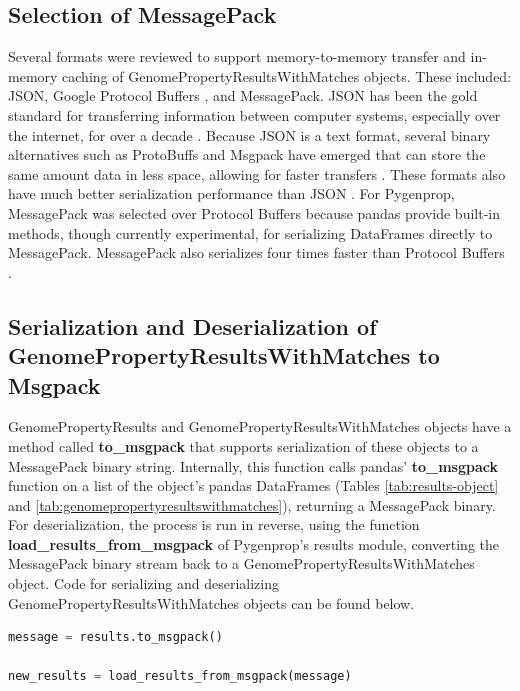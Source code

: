 \subsection{Selection of MessagePack}

Several formats were reviewed to support memory-to-memory transfer and in-memory caching of GenomePropertyResultsWithMatches objects. These included: JSON, Google Protocol Buffers \cite{varda2008protocol}, and MessagePack. JSON has been the gold standard for transferring information between computer systems, especially over the internet, for over a decade \cite{d4_softwareltd_2017}. Because JSON is a text format, several binary alternatives such as ProtoBuffs and Msgpack have emerged that can store the same amount data in less space, allowing for faster transfers \cite{furuhashi2013messagepack,varda2008protocol,krebs_2017,cooper_2010,bengtsson_24AD}. These formats also have much better serialization performance than JSON \cite{krebs_2017,cooper_2010,bengtsson_24AD}. For Pygenprop, MessagePack was selected over Protocol Buffers because pandas provide built-in methods, though currently experimental, for serializing DataFrames directly to MessagePack. MessagePack also serializes four times faster than Protocol Buffers \cite{cooper_2010}.

\subsection{Serialization and Deserialization of GenomePropertyResultsWithMatches to Msgpack}

GenomePropertyResults and GenomePropertyResultsWithMatches objects have a method called \textbf{to\_msgpack} that supports serialization of these objects to a MessagePack binary string. Internally, this function calls pandas' \textbf{to\_msgpack} function on a list of the object's pandas DataFrames (Tables \ref{tab:results-object} and \ref{tab:genomepropertyresultswithmatches}), returning a MessagePack binary. For deserialization, the process is run in reverse, using the function \textbf{load\_results\_from\_msgpack} of Pygenprop's results module, converting the MessagePack binary stream back to a GenomePropertyResultsWithMatches object. Code for serializing and deserializing GenomePropertyResultsWithMatches objects can be found below.

\begin{lstlisting}[language=Python]  
message = results.to_msgpack()

new_results = load_results_from_msgpack(message)
\end{lstlisting}

